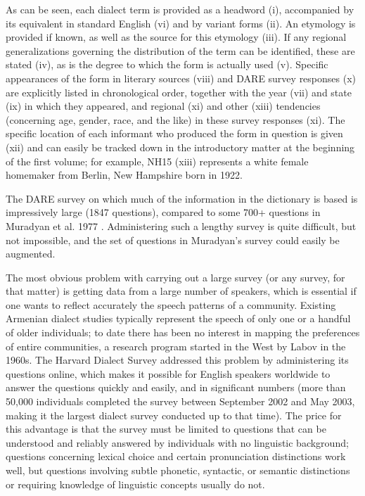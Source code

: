 \documentclass[output=paper]{langscibook}
\begin{document}
As can be seen, each dialect term is provided as a headword (i), accompanied by its equivalent in standard English (vi) and by variant forms (ii). An etymology is provided if known, as well as the source for this etymology (iii). If any regional generalizations governing the distribution of the term can be identified, these are stated (iv), as is the degree to which the form is actually used (v). Specific appearances of the form in literary sources (viii) and DARE survey responses (x) are explicitly listed in chronological order, together with the year (vii) and state (ix) in which they appeared, and regional (xi) and other (xiii) tendencies (concerning age, gender, race, and the like) in these survey responses (xi). The specific location of each informant who produced the form in question is given (xii) and can easily be tracked down in the introductory matter at the beginning of the first volume; for example, NH15 (xiii) represents a white female homemaker from Berlin, New Hampshire born in 1922.

The DARE survey on which much of the information in the dictionary is based is impressively large (1847 questions), compared to some 700+ questions in Muradyan et al. 1977 \citep{MuradyanEtAl-1977-DialectologyBook}. Administering such a lengthy survey is quite difficult, but not impossible, and the set of questions in Muradyan's survey could easily be augmented.

The most obvious problem with carrying out a large survey (or any survey, for that matter) is getting data from a large number of speakers, which is essential if one wants to reflect accurately the speech patterns of a community.  Existing Armenian dialect studies typically represent the speech of only one or a handful of older individuals; to date there has been no interest in mapping the preferences of entire communities, a research program started in the West by Labov in the 1960s.  The Harvard Dialect Survey  addressed this problem by administering its questions online, which makes it possible for English speakers worldwide to answer the questions quickly and easily, and in significant numbers (more than 50,000 individuals completed the survey between September 2002 and May 2003, making it the largest dialect survey conducted up to that time). The price for this advantage is that the survey must be limited to questions that can be understood and reliably answered by individuals with no linguistic background; questions concerning lexical choice and certain pronunciation distinctions work well, but questions involving subtle phonetic, syntactic, or semantic distinctions or requiring knowledge of linguistic concepts usually do not.
\end{document}
